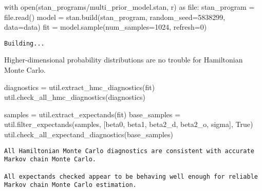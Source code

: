 \documentclass[
  letterpaper,
  DIV=11,
  numbers=noendperiod]{scrartcl}
\newenvironment{Shaded}{\begin{snugshade}}{\end{snugshade}}
\newcommand{\BuiltInTok}[1]{\textcolor[rgb]{0.00,0.23,0.31}{#1}}
\newcommand{\ControlFlowTok}[1]{\textcolor[rgb]{0.00,0.23,0.31}{#1}}
\newcommand{\DecValTok}[1]{\textcolor[rgb]{0.68,0.00,0.00}{#1}}
\newcommand{\ImportTok}[1]{\textcolor[rgb]{0.00,0.46,0.62}{#1}}
\newcommand{\NormalTok}[1]{\textcolor[rgb]{0.00,0.23,0.31}{#1}}
\newcommand{\OperatorTok}[1]{\textcolor[rgb]{0.37,0.37,0.37}{#1}}
\newcommand{\StringTok}[1]{\textcolor[rgb]{0.13,0.47,0.30}{#1}}
\newcommand{\VariableTok}[1]{\textcolor[rgb]{0.07,0.07,0.07}{#1}}
\begin{document}
\begin{Shaded}
\begin{Highlighting}[]
\ControlFlowTok{with} \BuiltInTok{open}\NormalTok{(}\StringTok{\textquotesingle{}stan\_programs/multi\_prior\_model.stan\textquotesingle{}}\NormalTok{, }\StringTok{\textquotesingle{}r\textquotesingle{}}\NormalTok{) }\ImportTok{as} \BuiltInTok{file}\NormalTok{:}
\NormalTok{  stan\_program }\OperatorTok{=} \BuiltInTok{file}\NormalTok{.read()}
\NormalTok{model }\OperatorTok{=}\NormalTok{ stan.build(stan\_program, random\_seed}\OperatorTok{=}\DecValTok{5838299}\NormalTok{, data}\OperatorTok{=}\NormalTok{data)}
\NormalTok{fit }\OperatorTok{=}\NormalTok{ model.sample(num\_samples}\OperatorTok{=}\DecValTok{1024}\NormalTok{, refresh}\OperatorTok{=}\DecValTok{0}\NormalTok{)}
\end{Highlighting}
\end{Shaded}

\begin{verbatim}
Building...
\end{verbatim}

Higher-dimensional probability distributions are no trouble for
Hamiltonian Monte Carlo.

\begin{Shaded}
\begin{Highlighting}[]
\NormalTok{diagnostics }\OperatorTok{=}\NormalTok{ util.extract\_hmc\_diagnostics(fit)}
\NormalTok{util.check\_all\_hmc\_diagnostics(diagnostics)}

\NormalTok{samples }\OperatorTok{=}\NormalTok{ util.extract\_expectands(fit)}
\NormalTok{base\_samples }\OperatorTok{=}\NormalTok{ util.filter\_expectands(samples,}
\NormalTok{                                      [}\StringTok{\textquotesingle{}beta0\textquotesingle{}}\NormalTok{, }\StringTok{\textquotesingle{}beta1\textquotesingle{}}\NormalTok{,}
                                       \StringTok{\textquotesingle{}beta2\_d\textquotesingle{}}\NormalTok{, }\StringTok{\textquotesingle{}beta2\_o\textquotesingle{}}\NormalTok{,}
                                       \StringTok{\textquotesingle{}sigma\textquotesingle{}}\NormalTok{],}
                                      \VariableTok{True}\NormalTok{)}
\NormalTok{util.check\_all\_expectand\_diagnostics(base\_samples)}
\end{Highlighting}
\end{Shaded}

\begin{verbatim}
All Hamiltonian Monte Carlo diagnostics are consistent with accurate
Markov chain Monte Carlo.
 
All expectands checked appear to be behaving well enough for reliable
Markov chain Monte Carlo estimation.
 
\end{verbatim}
\end{document}

